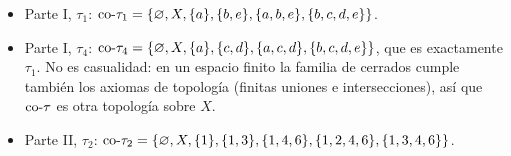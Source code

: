\begin{ejemplo}
\begin{itemize}
\item Parte I, $\tau_1$: $\mathrm{co}\text{-}\tau_1=\{\varnothing,X,\{a\},\{b,e\},\{a,b,e\},\{b,c,d,e\}\}$.
\item Parte I, $\tau_4$: $\mathrm{co}\text{-}\tau_4=\{\varnothing,X,\{a\},\{c,d\},\{a,c,d\},\{b,c,d,e\}\}$, que es exactamente $\tau_1$. No es
casualidad: en un espacio finito la familia de cerrados cumple también los axiomas de topología (finitas uniones e
intersecciones), así que $\mathrm{co}\text{-}\tau$ es otra topología sobre $X$.
\item Parte II, $\tau_2$: $\mathrm{co}\text{-}\tau_2=\{\varnothing,X,\{1\},\{1,3\},\{1,4,6\},\{1,2,4,6\},\{1,3,4,6\}\}$.
\end{itemize}
\end{ejemplo}
